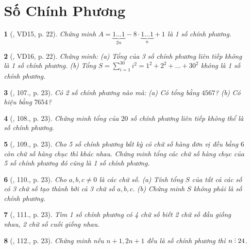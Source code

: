 \documentclass{article}
\newtheorem{baitoan}{}
\DeclareRobustCommand{\divby}{%
	\mathrel{\vbox{\baselineskip.65ex\lineskiplimit0pt\hbox{.}\hbox{.}\hbox{.}}}%
}
\begin{document}

\section{Số Chính Phương}

\begin{baitoan}[\cite{Tuyen_Toan_8}, VD15, p. 22]
	Chứng minh $A = \underbrace{1\ldots1}_{2n} - 8\cdot\underbrace{1\ldots1}_n + 1$ là 1 số chính phương. 
\end{baitoan}

\begin{baitoan}[\cite{Tuyen_Toan_8}, VD16, p. 22]
	Chứng minh: (a) Tổng của 3 số chính phương liên tiếp không là 1 số chính phương. (b) Tổng $S = \sum_{i=1}^{30} i^2 = 1^2 + 2^2 + \ldots + 30^2$ không là 1 số chính phương.
\end{baitoan}

\begin{baitoan}[\cite{Tuyen_Toan_8}, 107., p. 23]
	Có 2 số chính phương nào mà: (a) Có tổng bằng $4567$? (b) Có hiệu bằng $7654$?
\end{baitoan}

\begin{baitoan}[\cite{Tuyen_Toan_8}, 108., p. 23]
	Chứng minh tổng của $20$ số chính phương liên tiếp không thể là số chính phương.
\end{baitoan}

\begin{baitoan}[\cite{Tuyen_Toan_8}, 109., p. 23]
	Cho 5 số chính phương bất kỳ có chữ số hàng đơn vị đều bằng $6$ còn chữ số hàng chục thì khác nhau. Chứng minh tổng các chữ số hàng chục của 5 số chính phương đó cũng là 1 số chính phương.
\end{baitoan}

\begin{baitoan}[\cite{Tuyen_Toan_8}, 110., p. 23]
	Cho $a,b,c\ne0$ là các chữ số. (a) Tính tổng $S$ của tất cả các số có 3 chữ số tạo thành bởi cả 3 chữ số $a,b,c$. (b) Chứng minh $S$ không phải là số chính phương.
\end{baitoan}

\begin{baitoan}[\cite{Tuyen_Toan_8}, 111., p. 23]
	Tìm 1 số chính phương có 4 chữ số biết 2 chữ số đầu giống nhau, 2 chữ số cuối giống nhau.
\end{baitoan}

\begin{baitoan}[\cite{Tuyen_Toan_8}, 112., p. 23]
	Chứng minh nếu $n + 1,2n + 1$ đều là số chính phương thì $n\divby24$.
\end{baitoan}
\end{document}

